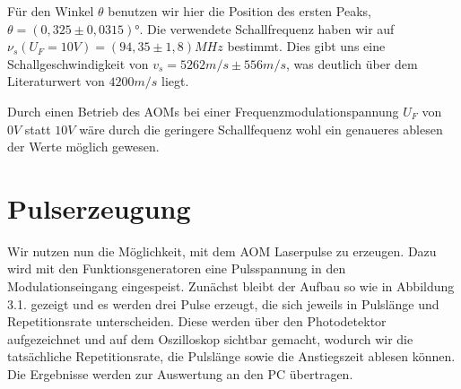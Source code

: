 \documentclass[bigchapter,colorback,accentcolor=tud4b,linedtoc,11pt]{tudreport}
\begin{document}
Für den Winkel $\theta$ benutzen wir hier die Position des ersten Peaks, $\theta = (0,325 \pm 0,0315)$°. Die verwendete Schallfrequenz haben wir auf $\nu_s\left( U_F= 10V \right) = \left( 94,35 \pm 1,8 \right)MHz$ bestimmt. Dies gibt uns eine Schallgeschwindigkeit von $v_s = 5262m/s \pm 556m/s$, was deutlich über dem Literaturwert von $4200m/s$ liegt.

Durch einen Betrieb des AOMs bei einer Frequenzmodulationspannung $U_F$ von $0V$ statt $10V$ wäre durch die geringere Schallfequenz wohl ein genaueres ablesen der Werte möglich gewesen.

\section{Pulserzeugung}

Wir nutzen nun die Möglichkeit, mit dem AOM Laserpulse zu erzeugen. Dazu wird mit den Funktionsgeneratoren eine Pulsspannung in den Modulationseingang eingespeist. Zunächst bleibt der Aufbau so wie in Abbildung 3.1. gezeigt und es werden drei Pulse erzeugt, die sich jeweils in Pulslänge und Repetitionsrate unterscheiden. Diese werden über den Photodetektor aufgezeichnet und auf dem Oszilloskop sichtbar gemacht, wodurch wir die tatsächliche Repetitionsrate, die Pulslänge sowie die Anstiegszeit ablesen können. Die Ergebnisse werden zur Auswertung an den PC übertragen.
\end{document}
